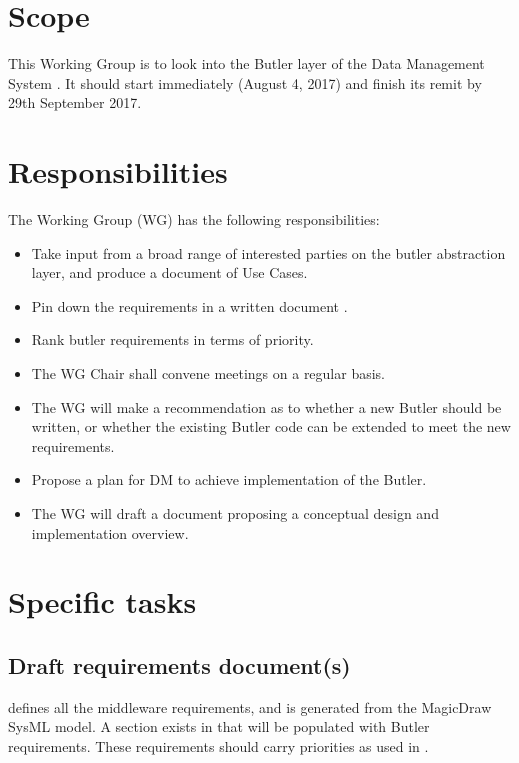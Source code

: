 \section{Scope}

This Working Group is to look into the Butler layer of the Data Management System .
It should start immediately (August 4, 2017) and finish its remit by 29th September 2017.


\section{Responsibilities}

The Working Group (WG) has the following responsibilities:

\begin{itemize}
 \item Take input from a broad range of interested parties on the butler abstraction layer, and produce a document of Use Cases.
 \item Pin down the requirements in a written document .
 \item Rank butler requirements in terms of priority.
 \item The WG Chair shall convene meetings on a regular basis.
 \item The WG will make a recommendation as to whether a new Butler should be written, or whether the existing Butler code can be extended to meet the new requirements.
 \item Propose a plan for DM to achieve implementation of the Butler.
 \item The WG will draft a document proposing a conceptual design and implementation overview.
\end{itemize}

\section{Specific tasks}

\subsection{Draft requirements document(s)}

 defines all the middleware requirements, and is generated from the MagicDraw SysML model.
A section exists in  that will be populated with Butler requirements.
These requirements should carry priorities as used in .

